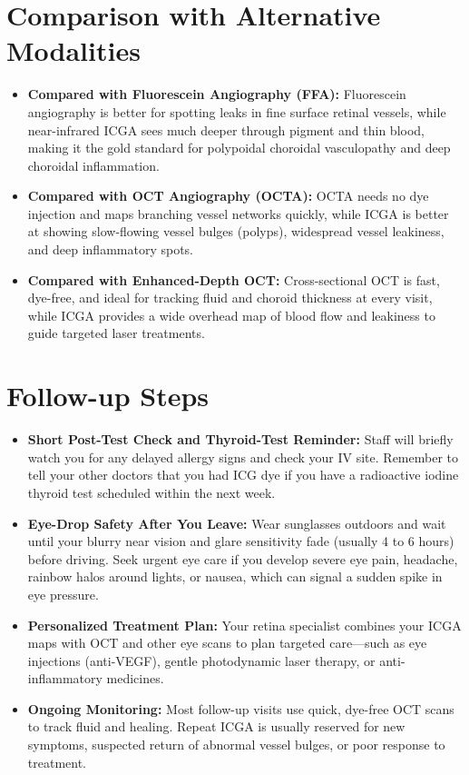 \section{Comparison with Alternative Modalities}

\begin{itemize}
    \item \textbf{Compared with Fluorescein Angiography (FFA):} Fluorescein angiography is better for spotting leaks in fine surface retinal vessels, while near-infrared ICGA sees much deeper through pigment and thin blood, making it the gold standard for polypoidal choroidal vasculopathy and deep choroidal inflammation.
    \item \textbf{Compared with OCT Angiography (OCTA):} OCTA needs no dye injection and maps branching vessel networks quickly, while ICGA is better at showing slow-flowing vessel bulges (polyps), widespread vessel leakiness, and deep inflammatory spots.
    \item \textbf{Compared with Enhanced-Depth OCT:} Cross-sectional OCT is fast, dye-free, and ideal for tracking fluid and choroid thickness at every visit, while ICGA provides a wide overhead map of blood flow and leakiness to guide targeted laser treatments.
\end{itemize}

\section{Follow-up Steps}

\begin{itemize}
    \item \textbf{Short Post-Test Check and Thyroid-Test Reminder:} Staff will briefly watch you for any delayed allergy signs and check your IV site. Remember to tell your other doctors that you had ICG dye if you have a radioactive iodine thyroid test scheduled within the next week.
    \item \textbf{Eye-Drop Safety After You Leave:} Wear sunglasses outdoors and wait until your blurry near vision and glare sensitivity fade (usually 4 to 6 hours) before driving. Seek urgent eye care if you develop severe eye pain, headache, rainbow halos around lights, or nausea, which can signal a sudden spike in eye pressure.
    \item \textbf{Personalized Treatment Plan:} Your retina specialist combines your ICGA maps with OCT and other eye scans to plan targeted care---such as eye injections (anti-VEGF), gentle photodynamic laser therapy, or anti-inflammatory medicines.
    \item \textbf{Ongoing Monitoring:} Most follow-up visits use quick, dye-free OCT scans to track fluid and healing. Repeat ICGA is usually reserved for new symptoms, suspected return of abnormal vessel bulges, or poor response to treatment.
\end{itemize}


